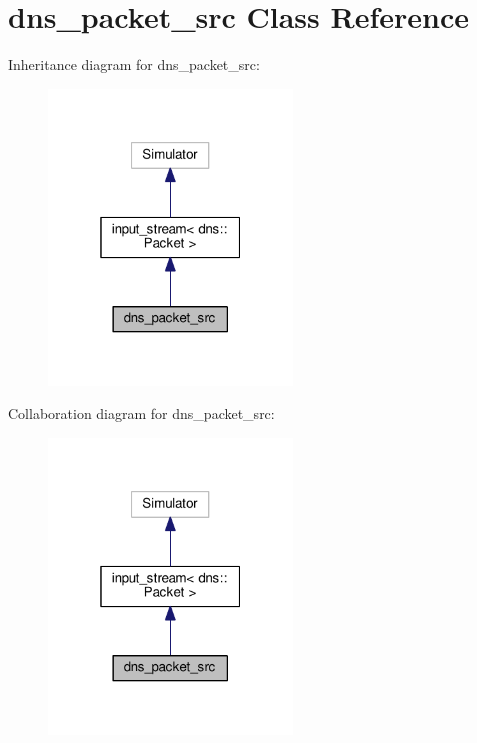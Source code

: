 \hypertarget{classdns__packet__src}{}\section{dns\+\_\+packet\+\_\+src Class Reference}
\label{classdns__packet__src}


Inheritance diagram for dns\+\_\+packet\+\_\+src\+:\nopagebreak
\begin{figure}[H]
\begin{center}
\leavevmode
\includegraphics[width=184pt]{classdns__packet__src__inherit__graph}
\end{center}
\end{figure}


Collaboration diagram for dns\+\_\+packet\+\_\+src\+:\nopagebreak
\begin{figure}[H]
\begin{center}
\leavevmode
\includegraphics[width=184pt]{classdns__packet__src__coll__graph}
\end{center}
\end{figure}

